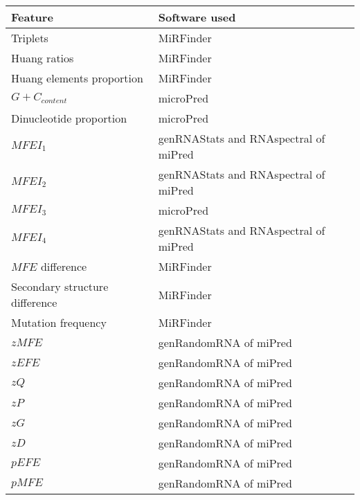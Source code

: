 \documentclass[a4paper,10pt]{article}
\begin{document}
\begin{longtable}{ p{8cm}  p{12cm} }
 \hline
 Feature & Software used \\
 \hline
 \endhead
 \hline
 \endlastfoot

 Triplets                     & MiRFinder \cite{HF07} \\
 Huang ratios                 & MiRFinder \cite{HF07} \\
 Huang elements proportion    & MiRFinder \cite{HF07} \\
 $G+C_{content}$              & microPred \cite{RV09} \\
 Dinucleotide proportion      & microPred \cite{RV09} \\
 $MFEI_1$                     & genRNAStats and RNAspectral of miPred \cite{JS10} \\
 $MFEI_2$                     & genRNAStats and RNAspectral of miPred \cite{JS10} \\
 $MFEI_3$                     & microPred \cite{RV09} \\
 $MFEI_4$                     & genRNAStats and RNAspectral of miPred \cite{JS10} \\
 $MFE$ difference             & MiRFinder \cite{HF07} \\
 Secondary structure difference & MiRFinder \cite{HF07} \\
 Mutation frequency           & MiRFinder \cite{HF07} \\
 $zMFE$                       & genRandomRNA of miPred \cite{JS10} \\
 $zEFE$                       & genRandomRNA of miPred \cite{JS10} \\
 $zQ$                         & genRandomRNA of miPred \cite{JS10} \\
 $zP$                         & genRandomRNA of miPred \cite{JS10} \\
 $zG$                         & genRandomRNA of miPred \cite{JS10} \\
 $zD$                         & genRandomRNA of miPred \cite{JS10} \\
 $pEFE$                       & genRandomRNA of miPred \cite{JS10} \\
 $pMFE$                       & genRandomRNA of miPred \cite{JS10}

\end{longtable}

\newpage



\end{document}
